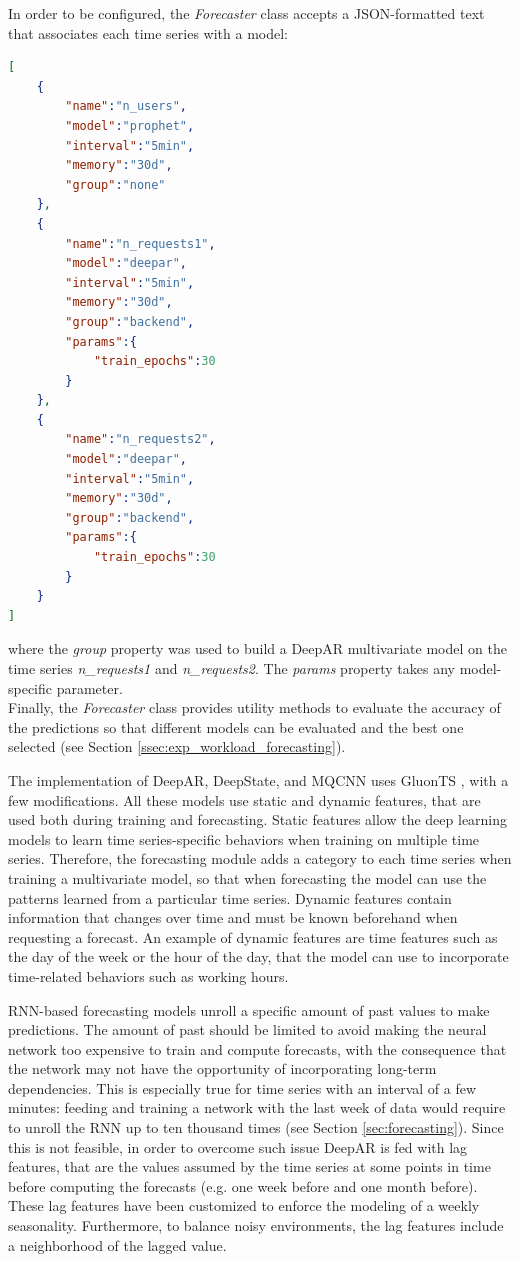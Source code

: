 \documentclass[a4paper, 12pt]{article} %
\begin{document}
	In order to be configured, the \textit{Forecaster} class accepts a JSON-formatted text that associates each time series with a model:\\
\begin{lstlisting}[language=json,firstnumber=1, frame=single]
[
	{
		"name":"n_users",
		"model":"prophet",
		"interval":"5min",
		"memory":"30d",
		"group":"none"
	},
	{
		"name":"n_requests1",
		"model":"deepar",
		"interval":"5min",
		"memory":"30d",
		"group":"backend",
		"params":{
			"train_epochs":30
		}
	},
	{
		"name":"n_requests2",
		"model":"deepar",
		"interval":"5min",
		"memory":"30d",
		"group":"backend",
		"params":{
			"train_epochs":30
		}
	}
]
\end{lstlisting}
	where the \textit{group} property was used to build a DeepAR multivariate model on the time series \textit{n\_requests1} and \textit{n\_requests2}. The \textit{params} property takes any model-specific parameter.\\
	Finally, the \textit{Forecaster} class provides utility methods to evaluate the accuracy of the predictions so that different models can be evaluated and the best one selected (see Section \ref{ssec:exp_workload_forecasting}).
	
	The implementation of DeepAR, DeepState, and MQCNN uses GluonTS \cite{GluonTS}, with a few modifications. All these models use static and dynamic features, that are used both during training and forecasting. Static features allow the deep learning models to learn time series-specific behaviors when training on multiple time series. Therefore, the forecasting module adds a category to each time series when training a multivariate model, so that when forecasting the model can use the patterns learned from a particular time series. Dynamic features contain information that changes over time and must be known beforehand when requesting a forecast. An example of dynamic features are time features such as the day of the week or the hour of the day, that the model can use to incorporate time-related behaviors such as working hours.
	
	RNN-based forecasting models unroll a specific amount of past values to make predictions. The amount of past should be limited to avoid making the neural network too expensive to train and compute forecasts, with the consequence that the network may not have the opportunity of incorporating long-term dependencies. This is especially true for time series with an interval of a few minutes: feeding and training a network with the last week of data would require to unroll the RNN up to ten thousand times (see Section \ref{sec:forecasting}). Since this is not feasible, in order to overcome such issue DeepAR is fed with lag features, that are the values assumed by the time series at some points in time before computing the forecasts (e.g. one week before and one month before). These lag features have been customized to enforce the modeling of a weekly seasonality. Furthermore, to balance noisy environments, the lag features include a neighborhood of the lagged value.
	
\end{document}
